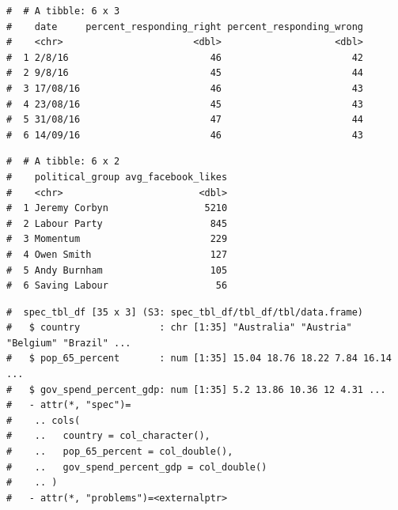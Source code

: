\documentclass[letterpaper,12pt,twoside,]{pinp}
\begin{document}
\begin{ShadedResult}
\begin{verbatim}
#  # A tibble: 6 x 3
#    date     percent_responding_right percent_responding_wrong
#    <chr>                       <dbl>                    <dbl>
#  1 2/8/16                         46                       42
#  2 9/8/16                         45                       44
#  3 17/08/16                       46                       43
#  4 23/08/16                       45                       43
#  5 31/08/16                       47                       44
#  6 14/09/16                       46                       43
\end{verbatim}
\end{ShadedResult}

\begin{Shaded}
\begin{Highlighting}[]
\SpecialCharTok{\%\textgreater{}\%} \NormalTok{()}
\end{Highlighting}
\end{Shaded}

\begin{ShadedResult}
\begin{verbatim}
#  # A tibble: 6 x 2
#    political_group avg_facebook_likes
#    <chr>                        <dbl>
#  1 Jeremy Corbyn                 5210
#  2 Labour Party                   845
#  3 Momentum                       229
#  4 Owen Smith                     127
#  5 Andy Burnham                   105
#  6 Saving Labour                   56
\end{verbatim}
\end{ShadedResult}

\begin{Shaded}
\begin{Highlighting}[]
\SpecialCharTok{\%\textgreater{}\%}\SpecialCharTok{::}\NormalTok{()}
\end{Highlighting}
\end{Shaded}

\begin{ShadedResult}
\begin{verbatim}
#  spec_tbl_df [35 x 3] (S3: spec_tbl_df/tbl_df/tbl/data.frame)
#   $ country              : chr [1:35] "Australia" "Austria" "Belgium" "Brazil" ...
#   $ pop_65_percent       : num [1:35] 15.04 18.76 18.22 7.84 16.14 ...
#   $ gov_spend_percent_gdp: num [1:35] 5.2 13.86 10.36 12 4.31 ...
#   - attr(*, "spec")=
#    .. cols(
#    ..   country = col_character(),
#    ..   pop_65_percent = col_double(),
#    ..   gov_spend_percent_gdp = col_double()
#    .. )
#   - attr(*, "problems")=<externalptr>
\end{verbatim}
\end{ShadedResult}
\end{document}
